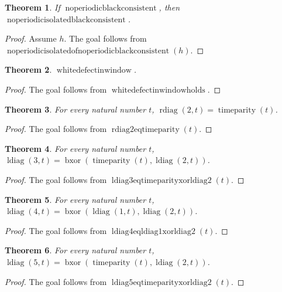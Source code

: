 \documentclass[11pt]{article}
\newtheorem{theorem}{Theorem}[section]
\theoremstyle{definition}
\begin{document}
\begin{theorem}
\label{ll:observations:no-periodic-isolated-of-no-periodic-black-consistent}
If \(\operatorname{noperiodicblackconsistent}\), then \(\operatorname{noperiodicisolatedblackconsistent}\).
\end{theorem}
\begin{proof}
Assume \(h\).
The goal follows from \(\operatorname{noperiodicisolatedofnoperiodicblackconsistent}(h)\).
\end{proof}
\begin{theorem}
\label{ll:observations:white-defect-in-window-holds}
\(\operatorname{whitedefectinwindow}\).
\end{theorem}
\begin{proof}
The goal follows from \(\operatorname{whitedefectinwindowholds}\).
\end{proof}
\begin{theorem}
\label{ll:observations:rdiag2-eq-time-parity}
For every natural number \(t\), \(\operatorname{rdiag}(2, t) = \operatorname{timeparity}(t)\).
\end{theorem}
\begin{proof}
The goal follows from \(\operatorname{rdiag2eqtimeparity}(t)\).
\end{proof}
\begin{theorem}
\label{ll:observations:ldiag3-eq-time-parity-xor-ldiag2}
For every natural number \(t\), \(\operatorname{ldiag}(3, t) = \operatorname{bxor}(\operatorname{timeparity}(t), \operatorname{ldiag}(2, t))\).
\end{theorem}
\begin{proof}
The goal follows from \(\operatorname{ldiag3eqtimeparityxorldiag2}(t)\).
\end{proof}
\begin{theorem}
\label{ll:observations:ldiag4-eq-ldiag1-xor-ldiag2}
For every natural number \(t\), \(\operatorname{ldiag}(4, t) = \operatorname{bxor}(\operatorname{ldiag}(1, t), \operatorname{ldiag}(2, t))\).
\end{theorem}
\begin{proof}
The goal follows from \(\operatorname{ldiag4eqldiag1xorldiag2}(t)\).
\end{proof}
\begin{theorem}
\label{ll:observations:ldiag5-eq-time-parity-xor-ldiag2}
For every natural number \(t\), \(\operatorname{ldiag}(5, t) = \operatorname{bxor}(\operatorname{timeparity}(t), \operatorname{ldiag}(2, t))\).
\end{theorem}
\begin{proof}
The goal follows from \(\operatorname{ldiag5eqtimeparityxorldiag2}(t)\).
\end{proof}
\end{document}
